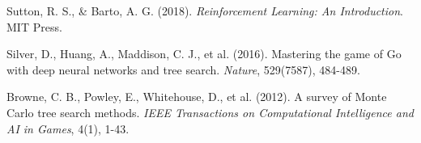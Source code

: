 \documentclass[12pt,a4paper]{article}
\begin{document}
\begin{thebibliography}{99}
Sutton, R. S., \& Barto, A. G. (2018). \textit{Reinforcement Learning: An Introduction}. MIT Press.

Silver, D., Huang, A., Maddison, C. J., et al. (2016). Mastering the game of Go with deep neural networks and tree search. \textit{Nature}, 529(7587), 484-489.

Browne, C. B., Powley, E., Whitehouse, D., et al. (2012). A survey of Monte Carlo tree search methods. \textit{IEEE Transactions on Computational Intelligence and AI in Games}, 4(1), 1-43.

\end{thebibliography}
\end{document}

